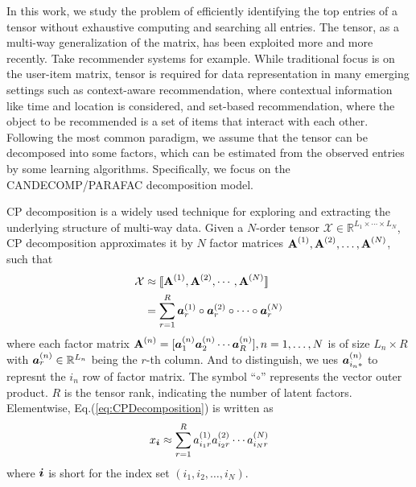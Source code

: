 \documentclass[letterpaper]{article}
\newcommand{\Sca}[3]{{#1}^{(#2)}_{i_#2#3}}%
\newcommand{\anr}[2]{\Sca{a}{#1}{#2}}
\newcommand{\T}[1]{\mathcal{#1}}
\newcommand{\KT}[1]{\llbracket #1 \rrbracket}
\newcommand{\V}[1]{{\boldsymbol{{\MakeLowercase{#1}}}}}
\newcommand{\ColVec}[3]{\V{#1}^{(#2)}_{#3}}
\newcommand{\RowVecA}[1]{\V{a}^{(#1)}_{i_#1*}}
\newcommand{\M}[1]{{\textbf{{\MakeUppercase{#1}}}}}
\newcommand{\FacMat}[2]{\M{#1}^{(#2)}}
\newcommand{\Eqn}[1]{Eq.(\ref{eq:#1})}
\begin{document}
In this work, 
we study the problem of efficiently identifying the top entries of a tensor 
without exhaustive computing and searching all entries. 
The tensor, as a multi-way generalization of the matrix, 
has been exploited more and more recently. 
Take recommender systems for example. 
While traditional focus is on the user-item matrix\cite{KoYe09}, 
tensor\cite{Rendle_PITF,HuYiLa15} is required for data representation in many emerging settings 
such as context-aware recommendation, 
where contextual information like time and location is considered, and set-based recommendation, 
where the object to be recommended is a set of items that interact with each other. 
Following the most common paradigm, we assume that the tensor can be decomposed into some factors, 
which can be estimated from the observed entries by some learning algorithms. 
Specifically, we focus on the CANDECOMP/PARAFAC decomposition model.

CP decomposition\cite{KoBa09} is a widely used technique for exploring and 
extracting the underlying structure of multi-way data. 
Given a $N$-order tensor $\T{X}\in\mathbb{R}^{L_1\times \cdots\times L_N}$, 
CP decomposition approximates it by $N$ factor matrices $\FacMat{A}{1},\FacMat{A}{2},\ldots,\FacMat{A}{N}$, 
such that
\begin{align}
\label{eq:CPDecomposition}
\T{X}&\approx\KT{\FacMat{A}{1},\FacMat{A}{2},\cdots,\FacMat{A}{N}} \\ \notag
&=\sum_{r=1}^R\ColVec{a}{1}{r}\circ\ColVec{a}{2}{r}\circ\cdots\circ\ColVec{a}{N}{r}
\end{align}
where each factor matrix 
$\FacMat{A}{n}=[\ColVec{a}{n}{1}\ColVec{a}{n}{2}\cdots\ColVec{a}{n}{R}], n=1,\ldots,N$
is of size $L_n\times R$ with $\ColVec{a}{n}{r}\in\mathbb{R}^{L_n}$ 
being the $r$-th column.
And to distinguish, we ues $\RowVecA{n}$ to represnt the $i_n$ row of factor matrix.
The symbol ``$\circ$'' represents the vector outer product. 
$R$ is the tensor rank, indicating the number of latent factors. 
Elementwise, \Eqn{CPDecomposition} is written as
\begin{align}
\label{eq:CPValue}
x_\V{i} \approx \sum_{r=1}^{R}\anr{1}{r}\anr{2}{r}\cdots\anr{N}{r}
\end{align}
where $\V{i}$ is short for the index set $(i_1,i_2,\ldots,i_N)$.
\end{document}
